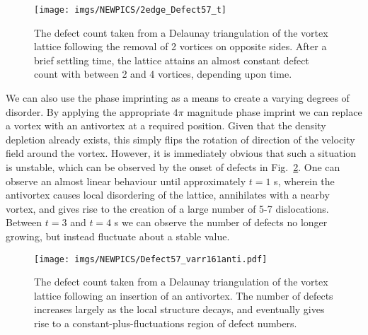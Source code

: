 \begin{figure}[bt]
    \texttt{[image: imgs/NEWPICS/2edge\_Defect57\_t]}
    \caption{The defect count taken from a Delaunay triangulation of the vortex lattice following the removal of 2 vortices on opposite sides. After a brief settling time, the lattice attains an almost constant defect count with between 2 and 4 vortices, depending upon time.}\label{fig:remove7_defect}
    \label{fig:vtx_rem2_edge}
\end{figure}


We can also use the phase imprinting as a means to create a varying degrees of disorder. By applying the appropriate $4\pi$ magnitude phase imprint we can replace a vortex with an antivortex at a required position. Given that the density depletion already exists, this simply flips the rotation of direction of the velocity field around the vortex. However, it is immediately obvious that such a situation is unstable, which can be observed by the onset of defects in Fig.~\ref{fig:varr161anti_defect}. One can observe an almost linear behaviour until approximately $t=1$ s, wherein the antivortex causes local disordering of the lattice, annihilates with a nearby vortex, and gives rise to the creation of a large number of 5-7 dislocations. Between $t=3$ and $t=4$ s we can observe the number of defects no longer growing, but instead fluctuate about a stable value.

\begin{figure}[tb]
    \vspace{1cm}
    \texttt{[image: imgs/NEWPICS/Defect57\_varr161anti.pdf]}
    \caption{The defect count taken from a Delaunay triangulation of the vortex lattice following an insertion of an antivortex. The number of defects increases largely as the local structure decays, and eventually gives rise to a constant-plus-fluctuations region of defect numbers.}\label{fig:varr161anti_defect}
\end{figure}

